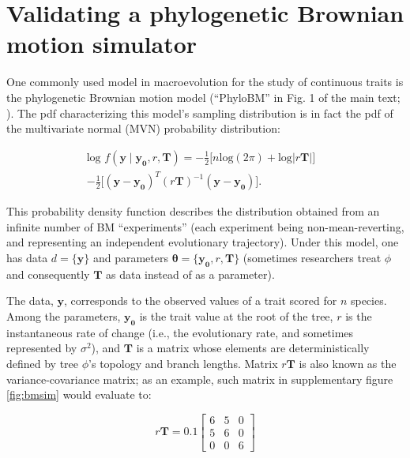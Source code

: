 \documentclass[oneside]{article}
\begin{document}
\section{Validating a phylogenetic Brownian motion simulator}

One commonly used model in macroevolution for the study of continuous traits is the phylogenetic Brownian motion model (``PhyloBM'' in Fig. 1 of the main text; \citealt{fel73}).
The pdf characterizing this model's sampling distribution is in fact the pdf of the multivariate normal (MVN) probability distribution:

\begin{equation}
  \begin{split}
    \text{log }f(\boldsymbol{y} \mid \boldsymbol{y_0}, r, \boldsymbol{T}) = -\frac{1}{2} \Big[ n\text{log}(2\pi) + \text{log}|r \boldsymbol{T}| \Big] & \\
    -\frac{1}{2} \Big[ (\mathbf{y} - \boldsymbol{y_0})^T (r \boldsymbol{T})^{-1} (\mathbf{y} - \boldsymbol{y_0}) \Big].
  \label{eq:bm}
  \end{split}
\end{equation}

\noindent This probability density function describes the distribution obtained from an infinite number of BM ``experiments'' (each experiment being non-mean-reverting, and representing an independent evolutionary trajectory).
Under this model, one has data $d = \{\boldsymbol{y}\}$ and parameters $\boldsymbol{\theta} = \{\boldsymbol{y_0}, r, \boldsymbol{T}\}$ (sometimes researchers treat $\phi$ and consequently $\boldsymbol{T}$ as data instead of as a parameter).

The data, $\boldsymbol{y}$, corresponds to the observed values of a trait scored for $n$ species.
Among the parameters, $\boldsymbol{y_0}$ is the trait value at the root of the tree, $r$ is the instantaneous rate of change (i.e., the evolutionary rate, and sometimes represented by $\sigma^2$), and $\boldsymbol{T}$ is a matrix whose elements are deterministically defined by tree $\phi$'s topology and branch lengths.
Matrix $r\boldsymbol{T}$ is also known as the variance-covariance matrix; as an example, such matrix in supplementary figure \ref{fig:bmsim} would evaluate to:

\begin{equation}
  r\boldsymbol{T} = 0.1
  \begin{bmatrix}
    6 & 5 & 0\\
    5 & 6 & 0\\
    0 & 0 & 6
  \end{bmatrix}
  \label{eq:mat}
\end{equation}
\end{document}
